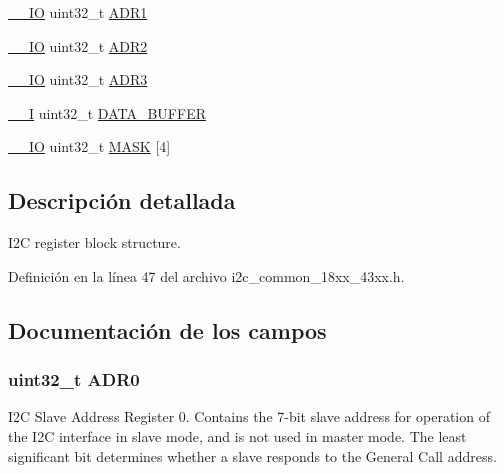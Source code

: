 \begin{DoxyCompactItemize}
\item 
\hyperlink{core__sc300_8h_aec43007d9998a0a0e01faede4133d6be}{\+\_\+\+\_\+\+IO} uint32\+\_\+t \hyperlink{struct_l_p_c___i2_c___t_af3d33330dee9193734ffbca23c7ed379}{A\+D\+R1}
\item 
\hyperlink{core__sc300_8h_aec43007d9998a0a0e01faede4133d6be}{\+\_\+\+\_\+\+IO} uint32\+\_\+t \hyperlink{struct_l_p_c___i2_c___t_a84a95bb11dc53608632b82f437bfd5a8}{A\+D\+R2}
\item 
\hyperlink{core__sc300_8h_aec43007d9998a0a0e01faede4133d6be}{\+\_\+\+\_\+\+IO} uint32\+\_\+t \hyperlink{struct_l_p_c___i2_c___t_a9822c81e3eadedb60b684dd57631fb7b}{A\+D\+R3}
\item 
\hyperlink{core__sc300_8h_af63697ed9952cc71e1225efe205f6cd3}{\+\_\+\+\_\+I} uint32\+\_\+t \hyperlink{struct_l_p_c___i2_c___t_ad18c5b32acbd5ecf72346ba4ca775b6f}{D\+A\+T\+A\+\_\+\+B\+U\+F\+F\+ER}
\item 
\hyperlink{core__sc300_8h_aec43007d9998a0a0e01faede4133d6be}{\+\_\+\+\_\+\+IO} uint32\+\_\+t \hyperlink{struct_l_p_c___i2_c___t_a1f3bff85f542af4618c6016817bb7b52}{M\+A\+SK} \mbox{[}4\mbox{]}
\end{DoxyCompactItemize}


\subsection{Descripción detallada}
I2C register block structure. 

Definición en la línea 47 del archivo i2c\+\_\+common\+\_\+18xx\+\_\+43xx.\+h.



\subsection{Documentación de los campos}
\subsubsection[{\texorpdfstring{A\+D\+R0}{ADR0}}]{ uint32\+\_\+t A\+D\+R0}\hypertarget{struct_l_p_c___i2_c___t_a9270d13a7f2f6699e6850efd2da81408}{}\label{struct_l_p_c___i2_c___t_a9270d13a7f2f6699e6850efd2da81408}
I2C Slave Address Register 0. Contains the 7-\/bit slave address for operation of the I2C interface in slave mode, and is not used in master mode. The least significant bit determines whether a slave responds to the General Call address. 

